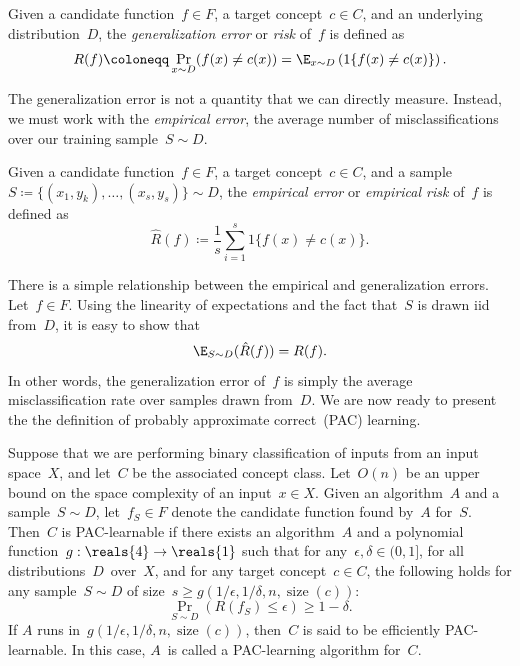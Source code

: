 \documentclass[11pt,a4paper]{article}
\numberwithin{equation}{section}
\newcommand{\ind}[1]{1\{#1\}}
\newcommand{\size}{\operatorname{size}}
\begin{document}
\begin{definition}
Given a candidate function~$f \in F$, a target concept~$c \in C$, and an
underlying distribution~$D$, the \emph{generalization error} or \emph{risk}
of~$f$ is defined as
\[
	R(f) \coloneqq \Pr_{x \sim D}(f(x) \neq c(x)) =
		\E_{x \sim D} \left(\ind{f(x) \neq c(x)}\right).
\]
\end{definition}

The generalization error is not a quantity that we can directly measure.
Instead, we must work with the \emph{empirical error}, the average number of
misclassifications over our training sample~$S \sim D$.

\begin{definition}
Given a candidate function~$f \in F$, a target concept~$c \in C$, and a
sample~$S \coloneqq \{(x_1, y_k), \ldots, (x_s, y_s)\} \sim D$, the
\emph{empirical error} or \emph{empirical risk} of~$f$ is defined as
\[
	\hat{R}(f) \coloneqq \frac{1}{s} \sum_{i = 1}^s \ind{f(x) \neq c(x)}.
\]
\end{definition}

There is a simple relationship between the empirical and generalization errors.
Let~$f \in F$.  Using the linearity of expectations and the fact that~$S$ is
drawn iid from~$D$, it is easy to show that
\[
	\E_{S \sim D} (\hat{R}(f)) = R(f).
\]
In other words, the generalization error of~$f$ is simply the average
misclassification rate over samples drawn from~$D$. We are now ready to present
the the definition of probably approximate correct~(PAC) learning.

\begin{definition}
Suppose that we are performing binary classification of inputs from an input
space~$X$, and let~$C$ be the associated concept class. Let~$O(n)$ be an upper
bound on the space complexity of an input~$x \in X$. Given an algorithm~$A$ and
a sample~$S \sim D$, let~$f_S \in F$ denote the candidate function found by~$A$
for~$S$. Then~$C$ is PAC-learnable if there exists an algorithm~$A$ and a
polynomial function~$g : \reals{4} \to \reals{1}$ such that for any~$\epsilon,
\delta \in (0, 1]$, for all distributions~$D$~over~$X$, and for any target
concept~$c \in C$, the following holds for any sample~$S \sim D$ of size~$s \geq
g(1/\epsilon, 1/\delta, n, \size(c))$:
\[
	\Pr_{S \sim D} (R(f_S) \leq \epsilon) \geq 1 - \delta.
\]
If $A$ runs in~$g(1/\epsilon, 1/\delta, n, \size(c))$, then~$C$ is said to be
efficiently PAC-learnable. In this case, $A$~is called a PAC-learning algorithm
for~$C$.
\end{definition}
\end{document}
